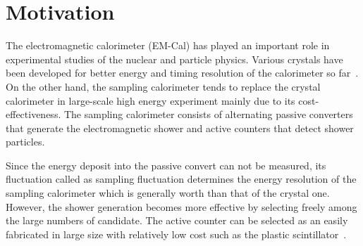 \documentclass[jkps,preprint,fleqn,showpacs,showkeys]{revtex4}
\begin{document}
\maketitle

\section{Motivation}
\label{sec:mot}
The electromagnetic calorimeter (EM-Cal) has played an important role in experimental studies of the nuclear and particle physics.  
Various crystals have been developed for better energy and timing resolution of the calorimeter so far~\cite{Calorimeter}. %
On the other hand, the sampling calorimeter tends to replace the crystal calorimeter in large-scale high energy experiment mainly due to its cost-effectiveness. The sampling calorimeter consists of alternating passive converters that generate the electromagnetic shower and active counters that detect shower particles. 

Since the energy deposit into the passive convert can not be measured, its fluctuation called as sampling fluctuation determines the energy resolution of the sampling calorimeter which is generally worth than that of the crystal one.
However, the shower generation becomes more effective by selecting freely among the large numbers of candidate. The active counter can be selected as an easily fabricated in large size with relatively low cost such as the plastic scintillator~\cite{E391a_barrel}. %
\end{document}
